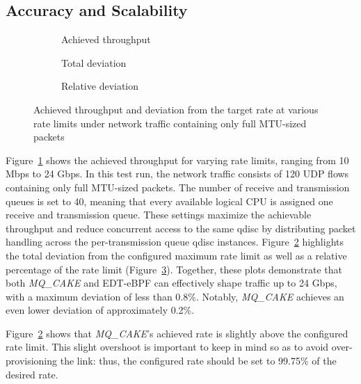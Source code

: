 \subsection{Accuracy and Scalability}
\begin{figure*}
    \begin{subfigure}{0.3\linewidth}
        \centering
        
        \caption{Achieved throughput}\label{fig:tp_rate_conformance}
    \end{subfigure}
    \hfill
    \begin{subfigure}{0.3\linewidth}
        \centering
        
        \caption{Total deviation}\label{fig:tp_deviation_total}
    \end{subfigure}
    \hfill
    \begin{subfigure}{0.3\linewidth}
        \centering
        
        \caption{Relative deviation}\label{fig:tp_deviation_perc}
    \end{subfigure}
    \caption{Achieved throughput and deviation from the target rate at various rate limits under
    network traffic containing only full MTU-sized packets}\label{fig:accuracy}
\end{figure*}
Figure~\ref{fig:tp_rate_conformance} shows the achieved throughput for varying rate limits, ranging from 10 Mbps to 24 Gbps.
%
In this test run, the network traffic consists of 120 UDP flows containing only full MTU-sized packets.
%
The number of receive and transmission queues is set to 40, meaning that every available logical CPU is assigned one receive and transmission queue.
%
These settings maximize the achievable throughput and reduce concurrent access to the same qdisc by distributing packet handling across the per-transmission queue qdisc instances.
%
Figure~\ref{fig:tp_deviation_total} highlights the total deviation from the configured maximum rate limit as well as a relative percentage of the rate limit (Figure~\ref{fig:tp_deviation_perc}).
%
Together, these plots demonstrate that both \textit{MQ\_CAKE} and EDT-eBPF can effectively shape traffic up to 24 Gbps, with a maximum deviation of less than 0.8\%. Notably, \textit{MQ\_CAKE} achieves an even lower deviation of approximately 0.2\%.

Figure~\ref{fig:tp_deviation_total} shows that  \textit{MQ\_CAKE}'s achieved rate is slightly above the configured rate limit.
%
This slight overshoot is important to keep in mind so as to avoid over-provisioning the link: thus, the configured rate should be set to 99.75\% of the desired rate.
%

